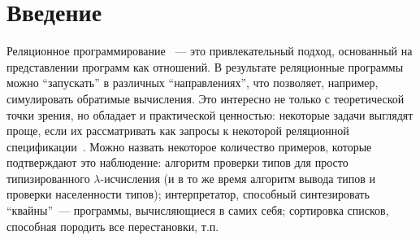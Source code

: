 
\section{Введение}
\label{intro}

Реляционное программирование~\cite{TRS} --- это привлекательный подход, основанный на представлении программ как отношений.
В результате реляционные программы можно \enquote{запускать} в различных \enquote{направлениях}, что позволяет, например, симулировать обратимые вычисления.
Это интересно не только с теоретической точки зрения, но обладает и практической ценностью: некоторые задачи выглядят проще, если их рассматривать как запросы к некоторой реляционной спецификации~\cite{WillThesis}.
Можно назвать некоторое количество примеров, которые подтверждают это наблюдение:
алгоритм проверки типов для просто типизированного $\lambda$-исчисления (и в то же время алгоритм вывода типов и проверки населенности типов);
интерпретатор, способный синтезировать \enquote{квайны}~--- программы, вычисляющиеся в самих себя;
сортировка списков, способная породить все перестановки, т.п.

